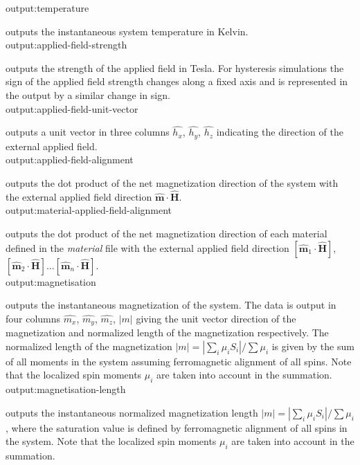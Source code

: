 {\zicf output:temperature} outputs the instantaneous system temperature in Kelvin.\\

{\zicf output:applied-field-strength}
outputs the strength of the applied field in Tesla. For hysteresis simulations the sign of the applied
field strength changes along a fixed axis and is represented in the output by a similar change in sign.\\

{\zicf output:applied-field-unit-vector}
outputs a unit vector in three columns $\hat{h_x}$, $\hat{h_y}$, $\hat{h_z}$ indicating
the direction of the external applied field.\\

{\zicf output:applied-field-alignment}
outputs the dot product of the net magnetization direction of the system with the external applied field
direction $\hat{\mathbf{m}} \cdot \hat{\mathbf{H}}$.\\

{\zicf output:material-applied-field-alignment}
outputs the dot product of the net magnetization direction of each material defined in the \textit{material} file with
the external applied field direction $\left[\hat{\mathbf{m}}_1 \cdot \hat{\mathbf{H}}\right]$, $\left[\hat{\mathbf{m}}_2
\cdot \hat{\mathbf{H}}\right]$...$\left[\hat{\mathbf{m}}_n \cdot \hat{\mathbf{H}}\right]$.\\

{\zicf output:magnetisation} outputs the
instantaneous magnetization of the system. The data is output in four columns $\hat{m_x}$,
$\hat{m_y}$, $\hat{m_z}$, $|m|$ giving the unit vector direction of the magnetization and
normalized length of the magnetization respectively. The normalized length of the magnetization
 $|m| = |\sum_i \mu_i S_i| / \sum \mu_i$ is given by the sum of all moments in the system
 assuming ferromagnetic alignment of all spins. Note that the localized spin moments $\mu_i$
 are taken into account in the summation.\\

{\zicf output:magnetisation-length}
outputs the instantaneous normalized magnetization length $|m| = |\sum_i \mu_i S_i| / \sum \mu_i$,
where the saturation value is defined by ferromagnetic alignment of all spins in the system. Note
that the localized spin moments $\mu_i$ are taken into account in the summation.\\

